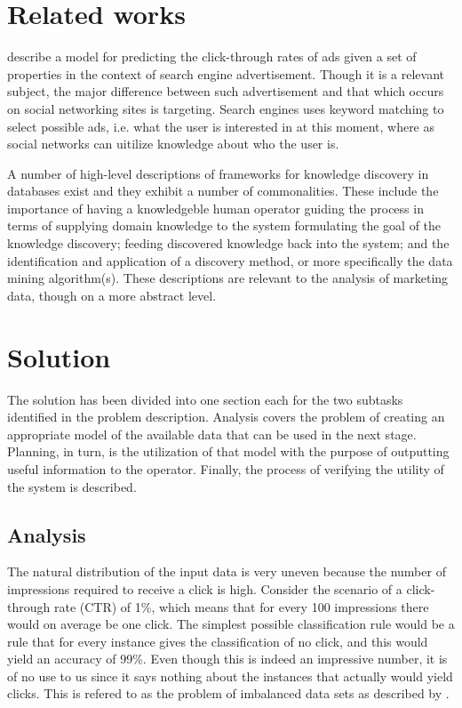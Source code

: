\documentclass[a4paper]{article}
\begin{document}
\section{Related works}
\citet{Richardson2007} describe a model for predicting the click-through rates of ads given a set of properties in the context of search engine advertisement. Though it is a relevant subject, the major difference between such advertisement and that which occurs on social networking sites is targeting. Search engines uses keyword matching to select possible ads, i.e. what the user is interested in at this moment, where as social networks can uitilize knowledge about who the user is.

A number of high-level descriptions of frameworks for knowledge discovery in databases exist \citep{Fayyad1996, Frawley1992} and they exhibit a number of commonalities. These include the importance of having a knowledgeble human operator guiding the process in terms of supplying domain knowledge to the system formulating the goal of the knowledge discovery; feeding discovered knowledge back into the system; and the identification and application of a discovery method, or more specifically the data mining algorithm(s). These descriptions are relevant to the analysis of marketing data, though on a more abstract level.

\section{Solution}
The solution has been divided into one section each for the two subtasks identified in the problem description. Analysis covers the problem of creating an appropriate model of the available data that can be used in the next stage. Planning, in turn, is the utilization of that model with the purpose of outputting useful information to the operator. Finally, the process of verifying the utility of the system is described.

\subsection{Analysis}
The natural distribution of the input data is very uneven because the number of impressions required to receive a click is high. Consider the scenario of a click-through rate (CTR) of 1\%, which means that for every 100 impressions there would on average be one click. The simplest possible classification rule would be a rule that for every instance gives the classification of no click, and this would yield an accuracy of 99\%. Even though this is indeed an impressive number, it is of no use to us since it says nothing about the instances that actually would yield clicks. This is refered to as the problem of imbalanced data sets as described by \citet{Chawla2004}.
\end{document}
